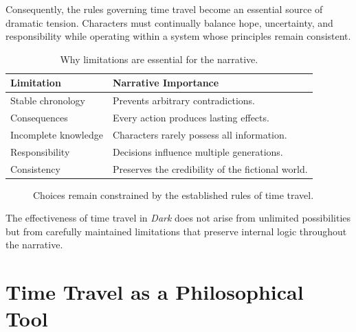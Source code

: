 \documentclass[12pt,oneside,openany]{book}
\begin{document}
Consequently, the rules governing time travel become an essential source of
dramatic tension. Characters must continually balance hope, uncertainty, and
responsibility while operating within a system whose principles remain
consistent.

\begin{table}[H]
\centering
\begin{tabular}{|p{4.2cm}|p{7.8cm}|}
\hline
\textbf{Limitation} & \textbf{Narrative Importance}\\
\hline
Stable chronology & Prevents arbitrary contradictions.\\
\hline
Consequences & Every action produces lasting effects.\\
\hline
Incomplete knowledge & Characters rarely possess all information.\\
\hline
Responsibility & Decisions influence multiple generations.\\
\hline
Consistency & Preserves the credibility of the fictional world.\\
\hline
\end{tabular}
\caption{Why limitations are essential for the narrative.}
\end{table}

\begin{figure}[H]
\centering
{}
\caption{Choices remain constrained by the established rules of time travel.}
\end{figure}

\begin{tcolorbox}[colback=purple!6,colframe=purple!60!black,title=Critical Insight]
The effectiveness of time travel in \textit{Dark} does not arise from unlimited
possibilities but from carefully maintained limitations that preserve internal
logic throughout the narrative.
\end{tcolorbox}

\section{Time Travel as a Philosophical Tool}
\end{document}
